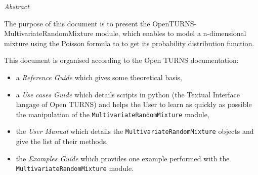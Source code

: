 \vspace{0.5in}
\begin{center}
\vspace{0.3in}
\emph{ Abstract}
\vspace{0.5in}
\end{center}

The purpose of this document is to present the OpenTURNS-MultivariateRandomMixture module, which enables to model a n-dimensional mixture using the 
Poisson formula to to get its probability distribution function.

This document is organised according to the Open TURNS documentation:
\begin{itemize}
\item a \textit{Reference Guide} which gives some theoretical basis,
\item a \textit{Use cases Guide} which details scripts in python (the Textual Interface langage of Open TURNS) and helps the User to learn as quickly as possible the manipulation of the \texttt{MultivariateRandomMixture} module,
\item the \textit{User Manual} which details the \texttt{MultivariateRandomMixture} objects and give the list of their methods,
\item the \textit{Examples Guide} which provides one example performed with the \texttt{MultivariateRandomMixture} module.
\end{itemize}

